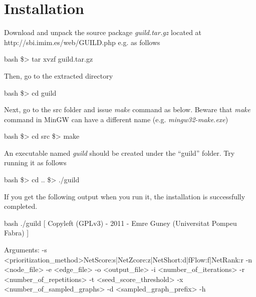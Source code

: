 \documentclass[11pt,twoside]{article}
\newcommand{\printcommand}[1]{\colorbox{code}{\scriptsize{\BUseVerbatim{#1}}}}
\begin{document}
\section{Installation}

Download and unpack the source package \textit{guild.tar.gz} located at 
http://sbi.imim.es/web/GUILD.php e.g. as follows

\begin{SaveVerbatim}{bash}
\$> tar xvzf guild.tar.gz
\end{SaveVerbatim}
\printcommand{bash}

\vspace{5 mm}
Then, go to the extracted directory%
\begin{SaveVerbatim}{bash}
\$> cd guild
\end{SaveVerbatim}
\printcommand{bash}

\vspace{5 mm}
Next, go to the src folder and issue \textit{make} command as below. Beware 
that \textit{make} command in MinGW can have a different name (e.g. 
\textit{mingw32-make.exe})
\begin{SaveVerbatim}{bash}
\$> cd src 
\$> make
\end{SaveVerbatim}
\printcommand{bash}

\vspace{5 mm}
An executable named \textit{guild} should be created under the ``guild'' folder.
Try running it as follows

\begin{SaveVerbatim}{bash}
\$> cd ..
\$> ./guild
\end{SaveVerbatim}
\printcommand{bash}

\vspace{5 mm}
If you get the following output when you run it, the installation is successfully 
completed. 

\begin{SaveVerbatim}{bash}
./guild [ Copyleft (GPLv3) - 2011 - Emre Guney (Universitat Pompeu Fabra) ]

 Arguments: 
     -s <prioritization_method>{NetScore:s|NetZcore:z|NetShort:d|fFlow:f|NetRank:r}
     -n <node_file>
     -e <edge_file>
     -o <output_file>
     -i <number_of_iterations>
     -r <number_of_repetitions>
     -t <seed_score_threshold>
     -x <number_of_sampled_graphs>
     -d <sampled_graph_prefix>
     -h
\end{SaveVerbatim}
\printcommand{bash}
\end{document}

